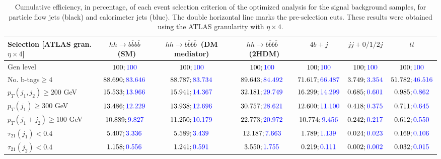 \begin{landscape}
		\begin{table}
			\centering
			\caption{Cumulative efficiency, in percentage, of each event selection criterion of the optimized analysis for the signal background samples, for particle flow jets (black) and calorimeter jets (blue). The double horizontal line marks the pre-selection cuts. These results were obtained using the ATLAS granularity with $\eta\times 4$.}
			\begin{tabular}{lcccccc}
				\toprule 
				\textbf{Selection [ATLAS gran. $\eta\times 4$]} & $hh\rightarrow b\overline{b}b\overline{b}$~(SM) & $hh\rightarrow b\overline{b}b\overline{b}$~(DM mediator) & $hh\rightarrow b\overline{b}b\overline{b}$~(2HDM) & $4b+j$  & $jj+0/1/2 j$ & $t\overline{t}$ \\
				\midrule
				Gen level & $100;\textcolor{blue}{100}$ & $100;\textcolor{blue}{100}$ &$100;\textcolor{blue}{100}$& $100;\textcolor{blue}{100}$& $100;\textcolor{blue}{100}$& $100;\textcolor{blue}{100}$ \\
				\rowcolor{black!7}No. b-tags$\geq 4$&$88.690;\textcolor{blue}{83.646}$&$88.787;\textcolor{blue}{83.734}$&$89.643;\textcolor{blue}{84.492}$&$71.617;\textcolor{blue}{66.487}$&$3.749;\textcolor{blue}{3.354}$&$51.782;\textcolor{blue}{46.516}$\\
				$p_T(j_1,j_2)\geq200$ GeV & $15.533;\textcolor{blue}{13.966}$ & $15.941;\textcolor{blue}{14.367}$&$32.181;\textcolor{blue}{29.749}$ &$16.299;\textcolor{blue}{14.299}$&$0.685;\textcolor{blue}{0.601}$&$0.985;\textcolor{blue}{0.862}$\\ 
				\midrule \midrule
				\rowcolor{black!7}$p_T(j_1)\geq 300$ GeV & $13.486;\textcolor{blue}{12.229}$ &$13.938;\textcolor{blue}{12.696}$  &$30.757;\textcolor{blue}{28.621}$&$12.600;\textcolor{blue}{11.100}$&$0.418;\textcolor{blue}{0.375}$&$0.711;\textcolor{blue}{0.645}$\\ 
				$p_T(j_1+j_2)\geq 100$ GeV &$10.889;\textcolor{blue}{9.827}$ & $11.250;\textcolor{blue}{10.179}$ &$22.773;\textcolor{blue}{20.972}$&$10.774;\textcolor{blue}{9.456}$&$0.242;\textcolor{blue}{0.217}$&$0.612;\textcolor{blue}{0.550}$\\
				\rowcolor{black!7}$\tau_{21}(j_1)<0.4$ & $5.407;\textcolor{blue}{3.336}$& $5.589;\textcolor{blue}{3.439}$&$12.187;\textcolor{blue}{7.663}$&$1.789;\textcolor{blue}{1.139}$&$0.024;\textcolor{blue}{0.023}$&$0.169;\textcolor{blue}{0.106}$\\
				$\tau_{21}(j_2)<0.4$ &$1.158;\textcolor{blue}{0.556}$ &$1.241;\textcolor{blue}{0.591}$ &$3.550;\textcolor{blue}{1.755}$&$0.219;\textcolor{blue}{0.111}$&$0.002;\textcolor{blue}{0.002}$&$0.032;\textcolor{blue}{0.015}$\\

\end{tabular}
\end{table}
\end{landscape}
